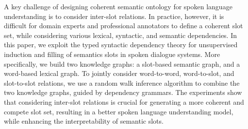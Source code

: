 A key challenge of designing coherent semantic ontology for spoken language understanding is to consider inter-slot relations. In practice, however, it is difficult for domain experts and professional annotators to define a coherent slot set, while considering various lexical, syntactic, and semantic dependencies. In this paper, we exploit the typed syntactic dependency theory for unsupervised induction and filling of semantics slots in spoken dialogue systems. More specifically, we build two knowledge graphs: a slot-based semantic graph, and a word-based lexical graph. To jointly consider word-to-word, word-to-slot, and slot-to-slot relations, we use a random walk inference algorithm to combine the two knowledge graphs, guided by dependency grammars. The experiments show that considering inter-slot relations is crucial for generating a more coherent and compete slot set, resulting in a better spoken language understanding model, while enhancing the interpretability of semantic slots.

